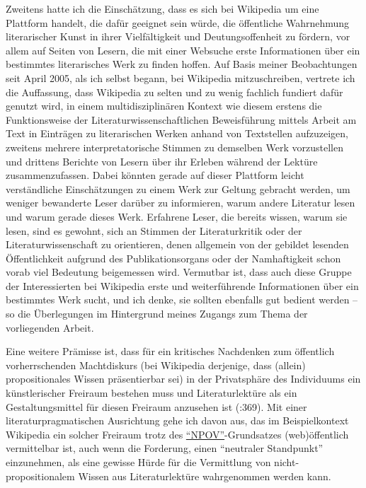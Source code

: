 \documentclass[fontsize=12pt]{scrartcl}
\begin{document}
Zweitens hatte ich die Einsch\"atzung, dass es sich bei Wi\-ki\-pe\-dia um eine Plattform handelt, die daf\"ur ge\-eig\-net sein w\"urde, die \"of\-fent\-liche Wahrnehmung li\-te\-ra\-rischer Kunst in ihrer Vielf\"altigkeit und Deutungsoffenheit zu f\"ordern, vor allem auf Seiten von Lesern\textsuperscript{\tiny *}, die mit einer Websuche erste Informationen \"uber ein be\-stimmtes li\-te\-ra\-risches Werk zu finden hoffen. Auf Basis meiner Beobachtungen seit April 2005, als ich \mbox{selbst} begann, bei Wi\-ki\-pe\-dia mitzuschrei\-ben, vertrete ich die Auffassung, dass Wi\-ki\-pe\-dia zu selten und zu wenig fachlich fundiert daf\"ur genutzt wird, in einem multidisziplin\"aren Kontext wie diesem erstens die Funktionsweise der Li\-te\-ra\-tur\-wissenschaftlichen Be\-weis\-f\"uh\-rung mittels Arbeit am Text in Eintr\"agen zu li\-te\-ra\-rischen Werken anhand von Textstellen aufzuzeigen, zweitens meh\-rere interpretatorische Stimmen zu demselben Werk vorzustellen und drittens Berichte von Lesern\textsuperscript{\tiny *} \"uber ihr Erleben w\"ahrend der Lekt\"ure zusammenzufassen. Dabei k\"onnten gerade auf dieser Plattform leicht verst\"andliche Einsch\"atzungen zu einem Werk zur Geltung gebracht werden, um weniger bewanderte Leser\textsuperscript{\tiny *} dar\"uber zu informieren, warum andere Li\-te\-ra\-tur lesen und warum gerade dieses Werk. Erfahrene Leser\textsuperscript{\tiny *}, die bereits wissen, warum sie lesen, sind es gewohnt, sich an Stimmen der Li\-te\-ra\-tur\-kritik oder der Li\-te\-ra\-tur\-wissenschaft zu orientieren, denen allgemein von der gebildet lesenden \"Of\-fent\-lichkeit aufgrund des Publikationsorgans oder der Namhaftigkeit schon vorab viel Bedeutung bei\-ge\-mes\-sen wird. Vermutbar ist, dass auch diese Gruppe der Interessierten bei Wi\-ki\-pe\-dia erste und weiterf\"uhrende Informationen \"uber ein be\-stimmtes Werk sucht, und ich denke, sie sollten ebenfalls gut bedient werden -- so die \"Uberlegungen im Hintergrund meines Zugangs zum Thema der vorliegenden Arbeit.

Eine weitere Pr\"amisse ist, dass f\"ur ein kritisches Nachdenken zum \"of\-fent\-lich vor\-herr\-schenden Machtdiskurs (bei Wi\-ki\-pe\-dia derjenige, dass (allein) pro\-po\-si\-ti\-o\-na\-les Wissen pr\"asentierbar sei) in der Privatsph\"are des Individuums ein k\"unstlerischer Freiraum bestehen muss und Li\-te\-ra\-tur\-lekt\"ure als ein Gestaltungsmittel f\"ur diesen Freiraum anzusehen ist (\cite{Lorenz2012}:369). Mit einer li\-te\-ra\-tur\-pragmatischen Ausrichtung gehe ich davon aus, das im Beispielkontext Wi\-ki\-pe\-dia ein solcher Freiraum trotz des \href{https://de.wikipedia.org/wiki/Wikipedia:Neutraler_Standpunkt}{"`NPOV"'}-Grund\-satzes (web)\"of\-fent\-lich vermittelbar ist, auch wenn die Forderung, einen "`neutraler Standpunkt"' einzunehmen, als eine gewisse H\"urde f\"ur die Ver\-mitt\-lung von nicht-pro\-po\-si\-ti\-o\-na\-lem Wissen aus Li\-te\-ra\-tur\-lekt\"ure wahrgenommen werden kann.
\end{document}
